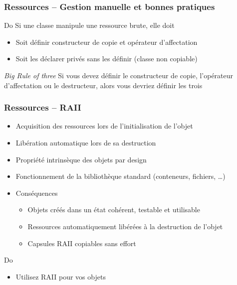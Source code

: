 \documentclass[C++.tex]{subfiles}
\begin{document}
\begin{frame}[fragile]
	\frametitle{Ressources -- Gestion manuelle et bonnes pratiques}
	\begin{exampleblock}{Do}
		Si une classe manipule une ressource brute, elle doit
		\begin{itemize}
			\item Soit définir constructeur de copie et opérateur d'affectation
			\item Soit les déclarer privés sans les définir (classe non copiable)
		\end{itemize}
	\end{exampleblock}

	\begin{exampleblock}{\textit{Big Rule of three}}
		Si vous devez définir le constructeur de copie, l'opérateur d'affectation ou le destructeur, alors vous devriez définir les trois

	\end{exampleblock}
\end{frame}

\begin{frame}[fragile]
	\frametitle{Ressources -- RAII}


	\begin{itemize}
		\item Acquisition des ressources lors de l'initialisation de l'objet
		\item Libération automatique lors de sa destruction


		\item Propriété intrinsèque des objets par design


		\item Fonctionnement de la bibliothèque standard (conteneurs, fichiers, \ldots{})
		\item Conséquences
		\begin{itemize}
			\item Objets créés dans un état cohérent, testable et utilisable
			\item Ressources automatiquement libérées à la destruction de l'objet

			
			\item Capsules RAII copiables sans effort
		\end{itemize}
	\end{itemize}

	\begin{exampleblock}{Do}
		\begin{itemize}
			\item Utilisez RAII pour vos objets
		\end{itemize}
	\end{exampleblock}
\end{frame}
\end{document}
